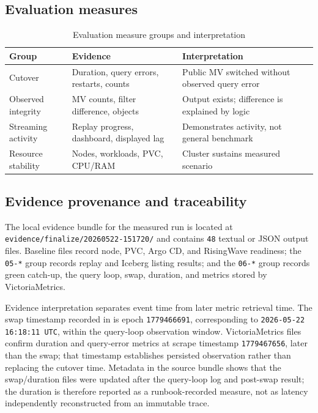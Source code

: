 \subsection{Evaluation measures}
\begin{table}[H]
\centering
\caption{Evaluation measure groups and interpretation}
\begin{tabularx}{\textwidth}{@{}p{}p{}Y@{}}
\toprule
\textbf{Group} & \textbf{Evidence} & \textbf{Interpretation}\\
\midrule
Cutover & Duration, query errors, restarts, counts & Public MV switched without observed query error\\
Observed integrity & MV counts, filter difference, objects & Output exists; difference is explained by logic\\
Streaming activity & Replay progress, dashboard, displayed lag & Demonstrates activity, not general benchmark\\
Resource stability & Nodes, workloads, PVC, CPU/RAM & Cluster sustains measured scenario\\
\bottomrule
\end{tabularx}
\end{table}

\subsection{Evidence provenance and traceability}
The local evidence bundle for the measured run is located at \texttt{evidence/finalize/\hspace{0pt}20260522-151720/} and contains \texttt{48} textual or JSON output files. Baseline files record node, PVC, Argo CD, and RisingWave readiness; the \texttt{05-*} group records replay and Iceberg listing results; and the \texttt{06-*} group records green catch-up, the query loop, swap, duration, and metrics stored by VictoriaMetrics.

Evidence interpretation separates event time from later metric retrieval time. The swap timestamp recorded in  is epoch \texttt{1779466691}, corresponding to \texttt{2026-05-22 16:18:11 UTC}, within the query-loop observation window. VictoriaMetrics files confirm duration and query-error metrics at scrape timestamp \texttt{1779467656}, later than the swap; that timestamp establishes persisted observation rather than replacing the cutover time. Metadata in the source bundle shows that the swap/duration files were updated after the query-loop log and post-swap result; the duration is therefore reported as a runbook-recorded measure, not as latency independently reconstructed from an immutable trace.
